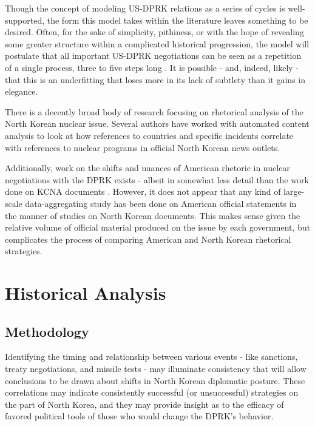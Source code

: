 \documentclass{article}
\begin{document}
Though the concept of modeling US-DPRK relations as a series of cycles is well-supported, the form this model takes within the literature leaves something to be desired. Often, for the sake of simplicity, pithiness, or with the hope of revealing some greater structure within a complicated historical progression, the model will postulate that all important US-DPRK negotiations can be seen as a repetition of a single process, three to five steps long \cite{fisher,jun}. It is possible - and, indeed, likely - that this is an underfitting that loses more in its lack of subtlety than it gains in elegance.

There is a decently broad body of research focusing on rhetorical analysis of the North Korean nuclear issue. Several authors \cite{rich12, rich14, sin} have worked with automated content analysis to look at how references to countries and specific incidents correlate with references to nuclear programs in official North Korean news outlets.

Additionally, work on the shifts and nuances of American rhetoric in nuclear negotiations with the DPRK exists - albeit in somewhat less detail than the work done on KCNA documents \cite{bleiker,cumings,harnisch,huntley}. However, it does not appear that any kind of large-scale data-aggregating study has been done on American official statements in the manner of studies on North Korean documents. This makes sense given the relative volume of official material produced on the issue by each government, but complicates the process of comparing American and North Korean rhetorical strategies.

\section{Historical Analysis}
\subsection{Methodology}

Identifying the timing and relationship between various events - like sanctions, treaty negotiations, and missile tests - may illuminate consistency that will allow conclusions to be drawn about shifts in North Korean diplomatic posture. These correlations may indicate consistently successful (or unsuccessful) strategies on the part of North Korea, and they may provide insight as to the efficacy of favored political tools of those who would change the DPRK's behavior.
\end{document}
